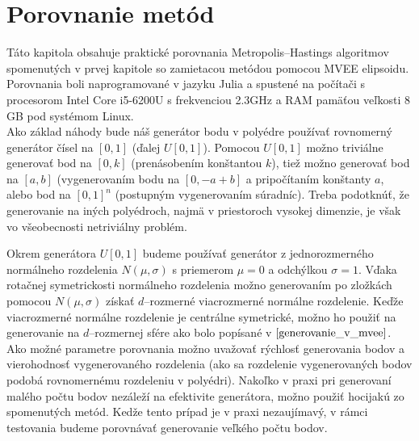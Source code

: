 \chapter{Porovnanie metód}

Táto kapitola obsahuje praktické porovnania Metropolis--Hastings algoritmov spomenutých v prvej kapitole so zamietacou metódou pomocou MVEE elipsoidu. Porovnania boli naprogramované v jazyku Julia a spustené na počítači s procesorom Intel Core i5-6200U s frekvenciou 2.3GHz a RAM pamäťou veľkosti 8 GB pod systémom Linux.\\

Ako základ náhody bude náš generátor bodu v polyédre používať rovnomerný generátor čísel na $[0,1]$ (ďalej $U[0,1]$). Pomocou $U[0,1]$ možno triviálne generovať bod na $[0,k]$ (prenásobením konštantou $k$), tiež možno generovať bod na $[a,b]$ (vygenerovaním bodu na $[0, -a+b]$ a pripočítaním konštanty $a$, alebo bod na $[0,1]^n$ (postupným vygenerovaním súradníc). Treba podotknúť, že generovanie na iných polyédroch, najmä v priestoroch vysokej dimenzie, je však vo všeobecnosti netriviálny problém.

Okrem generátora $U[0,1]$ budeme používať generátor z jednorozmerného normálneho rozdelenia $N(\mu, \sigma)$ s priemerom $\mu=0$ a odchýlkou $\sigma=1$. Vďaka rotačnej symetrickosti normálneho rozdelenia možno generovaním po zložkách pomocou $N(\mu, \sigma)$ získať $d$--rozmerné viacrozmerné normálne rozdelenie.
Keďže viacrozmerné normálne rozdelenie je centrálne symetrické, možno ho použiť na generovanie na $d$--rozmernej sfére ako bolo popísané v $\ref{generovanie_v_mvee}$.\\

Ako možné parametre porovnania možno uvažovať rýchlosť generovania bodov a vierohodnosť vygenerovaného rozdelenia (ako sa rozdelenie vygenerovaných bodov podobá rovnomernému rozdeleniu v polyédri).
Nakoľko v praxi pri generovaní malého počtu bodov nezáleží na efektivite generátora, možno použiť hocijakú zo spomenutých metód. Kedže tento prípad je v praxi nezaujímavý, v rámci testovania budeme porovnávať generovanie veľkého počtu bodov.

